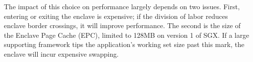 

The impact of this choice on performance
largely depends on two issues. First, entering or exiting the enclave 
is expensive; if the division of labor reduces enclave border crossings, 
it will improve performance.
The second is the size of the Enclave Page Cache (EPC),
limited to 128MB on version 1 of SGX.
If a large supporting framework tips the application's working set size
past this mark, the enclave will incur expensive swapping.


